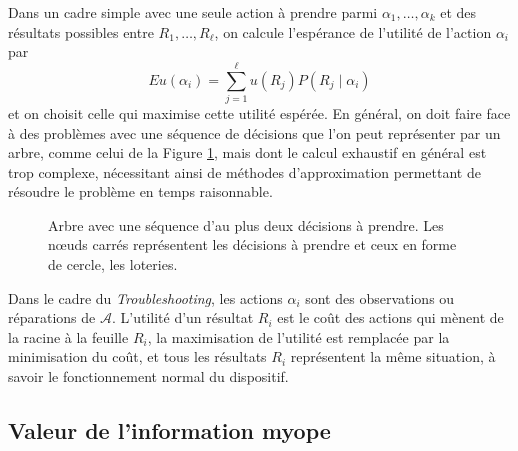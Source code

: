 \documentclass[a4paper,11pt]{article}
\theoremstyle{plain}
\begin{document}
Dans un cadre simple avec une seule action à prendre parmi $\alpha_1, \dotsc, \alpha_k$ et des résultats possibles entre $R_1, \dotsc, R_\ell$, on calcule l'espérance de l'utilité de l'action $\alpha_i$ par \[Eu(\alpha_i) = \sum_{j = 1}^\ell u(R_j)P(R_j\mid\alpha_i)\] et on choisit celle qui maximise cette utilité espérée. En général, on doit faire face à des problèmes avec une séquence de décisions que l'on peut représenter par un arbre, comme celui de la Figure \ref{arbre}, mais dont le calcul exhaustif en général est trop complexe, nécessitant ainsi de méthodes d'approximation permettant de résoudre le problème en temps raisonnable.

\begin{figure}[ht]
\centering
{}
\caption{Arbre avec une séquence d'au plus deux décisions à prendre. Les nœuds carrés représentent les décisions à prendre et ceux en forme de cercle, les loteries.}
\label{arbre}
\end{figure}

Dans le cadre du \emph{Troubleshooting}, les actions $\alpha_i$ sont des observations ou réparations de $\mathcal A$. L'utilité d'un résultat $R_i$ est le coût des actions qui mènent de la racine à la feuille $R_i$, la maximisation de l'utilité est remplacée par la minimisation du coût, et tous les résultats $R_i$ représentent la même situation, à savoir le fonctionnement normal du dispositif.

\subsection{Valeur de l'information myope}
\label{SecValeurInformation}
\end{document}
